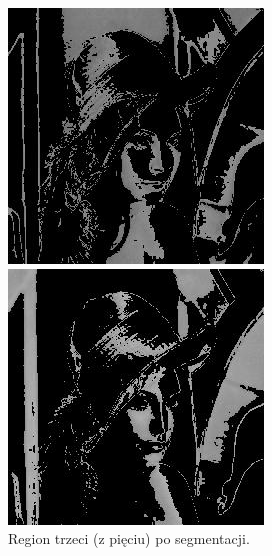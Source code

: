 \documentclass[10pt]{llncs}
\begin{document}
\begin{figure}[!htb]
  \includegraphics[width=\linewidth]{img/02_region_03.jpg}
  \caption{Region trzeci (z pięciu) po segmentacji.}\label{fig:7}
\endminipage\hfill
{}
  \includegraphics[width=\linewidth]{img/02_region_04.jpg}

\end{figure}
\end{document}
